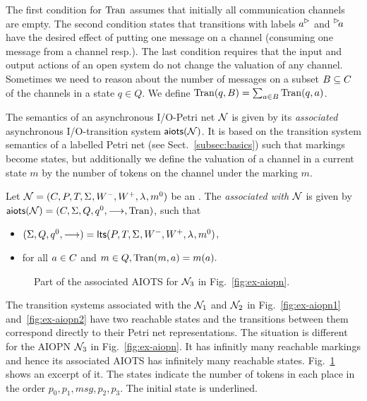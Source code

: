 The first condition for $\mathrm{Tran}$ assumes that initially all communication channels are empty.
 The second condition states that transitions with labels $\outact{a}$ and $\inact{a}$ have the desired effect
of putting one message on a channel (consuming one message from a channel resp.). 
The last condition requires that the input and output actions of an open system do not change the valuation of any channel.
Sometimes we need to reason about the number of messages on a subset $B \subseteq C$ of the channels in a state $q \in Q$. We define $\mathrm{Tran}(q,B) = \sum_{a \in B} \mathrm{Tran}(q,a)$.

The semantics of an asynchronous I/O-Petri net $\mathcal{N}$ is given by its \emph{associated} asynchronous I/O-transition system $\mathsf{aiots}(\mathcal{N})$.
It is based on the transition system semantics of a labelled Petri net (see Sect.~\ref{subsec:basics}) such that
markings become states, but additionally we define the valuation of a channel in a current state $m$ by the number of tokens on the channel
under the marking $m$.

\begin{definition}\label{def:assoc-aiots}
    Let $\mathcal{N} = (C_{},\allowbreak P_{},\allowbreak T_{},\allowbreak \Sigma_{},\allowbreak W_{}^-,\allowbreak W_{}^+,\allowbreak \lambda_{},\allowbreak m^0_{})$ be an \AIOPN. The \AIOTS \emph{associated with} $\mathcal{N}$ is given by $\mathsf{aiots}(\mathcal{N}) = (C, \Sigma,Q,q^0,\stackrel{}{\longrightarrow},\mathrm{Tran})$, such that
    \begin{itemize}
        \item $(\Sigma,Q,q^0,\stackrel{}{\longrightarrow}) = \mathsf{lts} (P_{}, \allowbreak T_{}, \allowbreak \Sigma_{}, \allowbreak W_{}^-, \allowbreak W_{}^+, \allowbreak \lambda_{}, \allowbreak m^0_{})$,
        \item for all $a \in C$ and $m \in Q, \mathrm{Tran}(m,a) = m(a).$ 
    \end{itemize}
\end{definition}

\begin{figure}
    \centering
    
    \caption{Part of the associated AIOTS for $\mathcal{N}_3$ in Fig.~\ref{fig:ex-aiopn}.}\label{fig:ex-associatedAIOTS}
\end{figure}
\begin{example}\label{ex:aiots}
 The transition systems associated with the \AIOPNs $\mathcal{N}_1$ and $\mathcal{N}_2$ in Fig.~\ref{fig:ex-aiopn1} and~\ref{fig:ex-aiopn2}
 have two reachable states and the transitions between them correspond directly to their Petri net representations. 
The situation is different for the AIOPN $\mathcal{N}_3$ in Fig.~\ref{fig:ex-aiopn}. It has infinitly many reachable markings
and hence its associated AIOTS has infinitely many reachable states. 
Fig.~\ref{fig:ex-associatedAIOTS} shows an excerpt of it. 
The states indicate the number of tokens in each place in the order $p_0, p_1, msg, p_2, p_3$. The initial state is underlined.
\end{example}


